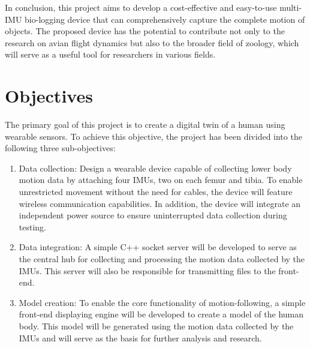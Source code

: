 In conclusion, this project aims to develop a cost-effective and easy-to-use multi-IMU bio-logging device that can comprehensively capture the complete motion of objects.
The proposed device has the potential to contribute not only to the research on avian flight dynamics but also to the broader field of zoology, which will serve as a useful tool for researchers in various fields.




\section{Objectives}
The primary goal of this project is to create a digital twin of a human using wearable sensors.
To achieve this objective, the project has been divided into the following three sub-objectives:
\begin{enumerate}\label{obj}
    \item \label{itm:obj-data-collection}Data collection:
    Design a wearable device capable of collecting lower body motion data by attaching four IMUs, two on each femur and tibia.
    To enable unrestricted movement without the need for cables, the device will feature wireless communication capabilities.
    In addition, the device will integrate an independent power source to ensure uninterrupted data collection during testing.

    \item \label{itm:obj-data-integration}Data integration:
    A simple C++ socket server will be developed to serve as the central hub for collecting and processing the motion data collected by the IMUs.
    This server will also be responsible for transmitting files to the front-end.

    \item \label{itm:obj-model-creation} Model creation:
    To enable the core functionality of motion-following, a simple front-end displaying engine will be developed to create a model of the human body.
    This model will be generated using the motion data collected by the IMUs and will serve as the basis for further analysis and research.
\end{enumerate}



